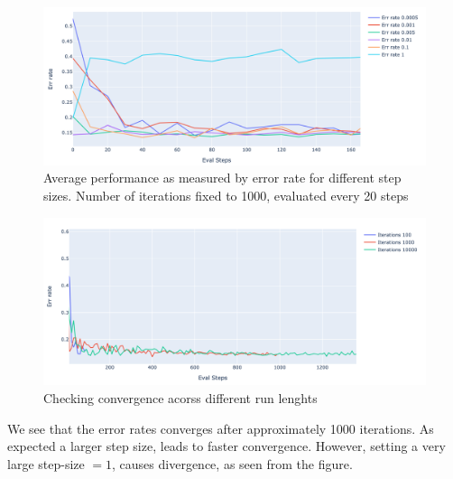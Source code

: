 \documentclass[11pt]{article}
\begin{document}
\begin{figure}[!htbp]
    \centering
    \includegraphics[width=\textwidth]{./images/step-sizes.png}
    \caption{Average performance as measured by error rate for different step sizes. Number of iterations fixed to 1000, evaluated every 20 steps}
\end{figure}

\begin{figure}[!htbp]
    \centering
    \includegraphics[width=\textwidth]{./images/iterations.png}
    \caption{Checking convergence acorss different run lenghts}
\end{figure}

We see that the error rates converges after approximately 1000 iterations. As expected a larger step size, leads to faster convergence. However, setting a very large step-size $= 1$, causes divergence, as seen from the figure.
\end{document}

